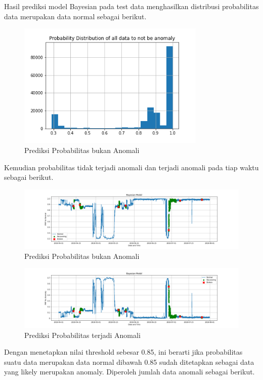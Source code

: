 Hasil prediksi model Bayesian pada test data menghasilkan distribusi probabilitas data merupakan data normal sebagai berikut.
\begin{figure}[h]
    \centering
    \includegraphics[width=0.8\textwidth]{resources/Bayes/Bayes_ProbDist.png}
    \caption{Prediksi Probabilitas bukan Anomali}
\end{figure}
Kemudian probabilitas tidak terjadi anomali dan terjadi anomali pada tiap waktu sebagai berikut.
\begin{figure}[h]
    \centerline{\includegraphics[width=1.4\textwidth]{resources/Bayes/Bayes_normal_PMF.png}}
    \caption{Prediksi Probabilitas bukan Anomali}
\end{figure}
\begin{figure}[h]
    \centerline{\includegraphics[width=1.4\textwidth]{resources/Bayes/Bayes_anomaly_PMF.png}}
    \caption{Prediksi Probabilitas terjadi Anomali}
\end{figure}
Dengan menetapkan nilai threshold sebesar 0.85, ini berarti jika probabilitas suatu data merupakan data normal dibawah 0.85 sudah ditetapkan sebagai data yang likely merupakan anomaly. Diperoleh jumlah data anomali sebagai berikut.
